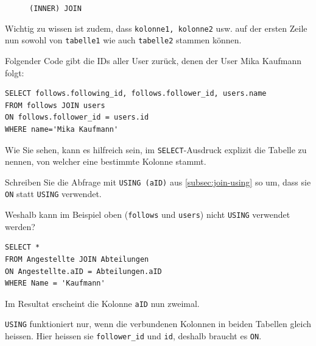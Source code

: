 \begin{figure}[H]
  \centering
  \caption{\lstinline|(INNER) JOIN|}
  \label{fig:venn-join}
\end{figure}

Wichtig zu wissen ist zudem, dass \texttt{kolonne1, kolonne2} usw. auf der ersten Zeile nun sowohl von \texttt{tabelle1} wie auch \texttt{tabelle2} stammen können.

\begin{myexample}
Folgender Code gibt die IDs aller User zurück, denen der User Mika Kaufmann folgt:
\begin{lstlisting}
SELECT follows.following_id, follows.follower_id, users.name
FROM follows JOIN users
ON follows.follower_id = users.id
WHERE name='Mika Kaufmann'
\end{lstlisting}

Wie Sie sehen, kann es hilfreich sein, im \lstinline|SELECT|-Ausdruck explizit die Tabelle zu nennen, von welcher eine bestimmte Kolonne stammt.
\end{myexample}

\begin{myexercise}
  \begin{aenum}
    \item Schreiben Sie die Abfrage mit \lstinline|USING (aID)| aus \cref{subsec:join-using} so um, dass sie \lstinline|ON| statt \lstinline|USING| verwendet.
    \item Weshalb kann im Beispiel oben (\texttt{follows} und \texttt{users}) nicht \lstinline|USING| verwendet werden?
  \end{aenum}
  \begin{myanswer}
    \begin{aenum}
      \item \begin{lstlisting}
SELECT *
FROM Angestellte JOIN Abteilungen
ON Angestellte.aID = Abteilungen.aID
WHERE Name = 'Kaufmann'
\end{lstlisting}
      Im Resultat erscheint die Kolonne \texttt{aID} nun zweimal.
      \item \lstinline|USING| funktioniert nur, wenn die verbundenen Kolonnen in beiden Tabellen gleich heissen. Hier heissen sie \texttt{follower\_id} und \texttt{id}, deshalb braucht es \lstinline|ON|.
    \end{aenum}
  \end{myanswer}
\end{myexercise}

